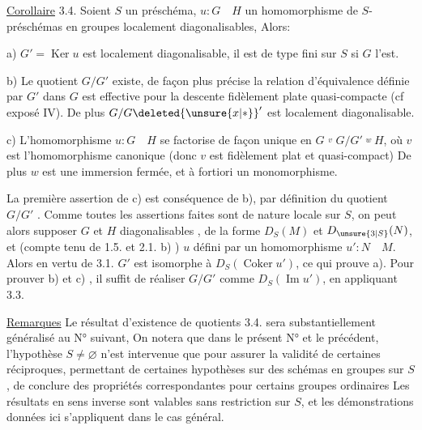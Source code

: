\uline{Corollaire} 3.4. Soient $S$ un préschéma, $u:G\quad H$ un homomorphisme
de  $S$-préschémas en groupes localement diagonalisables, Alors:

a) $G'=\operatorname{Ker}u$ est localement diagonalisable, il est de type fini sur $S$ si $G$ l'est.

b) Le quotient $G/G'$ existe, de façon plus précise la relation
d'équivalence définie par $G'$ dans $G$ est effective pour la descente
fidèlement plate quasi-compacte (cf exposé IV). De plus $G/G\deleted{\unsure{x|*}}'$ est
localement diagonalisable.

c)  L'homomorphisme $u:G\quad H$ se factorise
de façon unique en $G\overset v{\quad}G/G'\overset w{\quad}H$, où $v$ est l'homomorphisme
canonique (donc $v$ est fidèlement plat et quasi-compact) De plus
$w$ est une immersion fermée, et à fortiori un monomorphisme.

La première assertion de c) est conséquence de b), par définition
du quotient $G/G'$ . Comme toutes les assertions faites sont de nature
locale sur $S$, on peut alors supposer $G$ et $H$  diagonalisables ,  de la forme $D_S(M)$ et $D_{\unsure{3|S}}(N)$, et (compte tenu de 1.5.
et 2.1. b) ) $u$ défini par un homomorphisme $u':N\quad M$. Alors en
vertu de 3.1. $G'$ est isomorphe à $D_S(\operatorname{Coker}u')$, ce qui prouve a). Pour
prouver b) et c) , il suffit de réaliser $G/G'$ comme $D_S(\operatorname{Im}u')$, en
appliquant 3.3.

\uline{Remarques} Le résultat d'existence de quotients 3.4. sera substantiellement généralisé au N° suivant,  On notera que dans le présent
N° et le précédent, l'hypothèse $S\ne\varnothing$ n'est intervenue que pour assurer la validité de certaines réciproques,  permettant de certaines hypothèses sur des schémas en groupes sur $S$, de
conclure des propriétés correspondantes pour certains groupes ordinaires
Les résultats en sens inverse sont valables sans restriction sur $S$, et
les démonstrations données ici s'appliquent dans le cas général.
